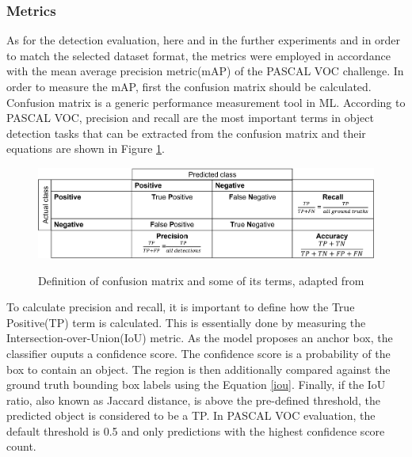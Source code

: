 \documentclass[english, 12pt, a4paper, elec, utf8, a-1b, online]{aaltothesis}
\begin{document}
\subsubsection{Metrics}
\label{metrics_section} 

As for the detection evaluation, here and in the further experiments and in order to match the selected dataset format, the metrics were employed in accordance with the mean average precision metric(mAP) of the PASCAL VOC \cite{Everingham10} challenge. In order to measure the mAP, first the confusion matrix should be calculated. Confusion matrix is a generic performance measurement tool in ML. According to PASCAL VOC, precision and recall are the most important terms in object detection tasks that can be extracted from the confusion matrix and their equations are shown in Figure \ref{confusion}.

\begin{figure}[htb]
	\begin{center}
		\includegraphics[width=14cm]{./confusion.png}
	\end{center}
	\caption{Definition of confusion matrix and some of its terms, adapted from \cite{mAp_blog}}
	\begin{center}
		\label{confusion}
	\end{center}
\end{figure}
\FloatBarrier


To calculate precision and recall, it is important to define how the True Positive(TP) term is calculated. This is essentially done by measuring the  Intersection-over-Union(IoU) metric. As the model proposes an anchor box, the classifier ouputs a confidence score. The confidence score is a probability of the box to contain an object. The region is then additionally compared against the ground truth bounding box labels using the Equation \ref{iou}. Finally, if the IoU ratio, also known as Jaccard distance, is above the pre-defined threshold, the predicted object is considered to be a TP. In PASCAL VOC evaluation, the default threshold is 0.5 \cite{mAp_blog} and only predictions with the highest confidence score count. 
\end{document}
